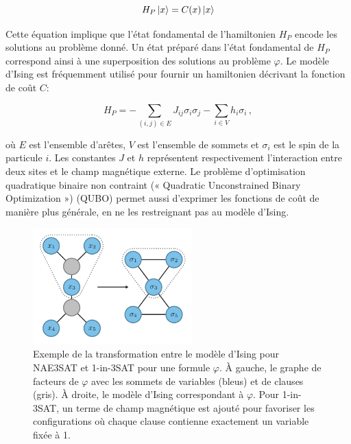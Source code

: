 \begin{equation}
    H_{P} \ket{x} = C(x) \ket{x}
\end{equation}

Cette équation implique que l'état fondamental de l'hamiltonien $H_{P}$ encode les solutions au problème donné. Un état préparé dans l'état fondamental de $H_{P}$ correspond ainsi à une superposition des solutions au problème $\varphi$. Le modèle d'Ising est fréquemment utilisé pour fournir un hamiltonien décrivant la fonction de coût $C$:

\begin{equation}
    \label{eq:hamiltonien-ising}
    H_P = - \sum_{(i,j) \in E} J_{ij} \sigma_i \sigma_j - \sum_{i \in V} h_i \sigma_i \,,
\end{equation}

où $E$ est l'ensemble d'arêtes, $V$ est l'ensemble de sommets et $\sigma_{i}$ est le spin de la particule $i$. Les constantes $J$ et $h$ représentent respectivement l'interaction entre deux sites et le champ magnétique externe. Le problème d'optimisation quadratique binaire non contraint (« Quadratic Unconstrained Binary Optimization ») (QUBO) permet aussi d'exprimer les fonctions de coût de manière plus générale, en ne les restreignant pas au modèle d'Ising.

\begin{figure}[h]
    \centering
    \includegraphics[width=0.55\textwidth]{figures/ising-mapping}
    \caption[Transformation du problème \#NAE3SAT et \#1-in-3SAT au modèle d'Ising]{Exemple de la transformation entre le modèle d'Ising pour NAE3SAT et 1-in-3SAT pour une formule $\varphi$. À gauche, le graphe de facteurs de $\varphi$ avec les sommets de variables (bleus) et de clauses (gris). À droite, le modèle d'Ising correspondant à $\varphi$. Pour 1-in-3SAT, un terme de champ magnétique est ajouté pour favoriser les configurations où chaque clause contienne exactement un variable fixée à 1.}
    \label{fig:transformation-ising}
\end{figure}


